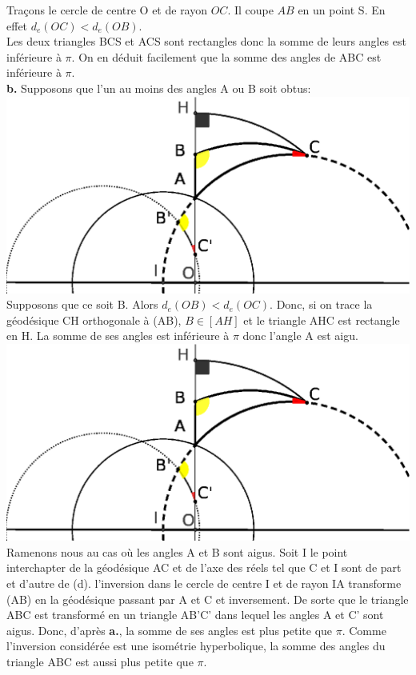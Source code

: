 \documentclass[a4paper, 12pt, twoside]{book}
\begin{document}
  Traçons le cercle de centre O et de rayon $OC$. Il coupe $AB$ en un point S. En effet  $d_{e}(OC)<d_{e}(OB)$. \\
  
  Les deux triangles BCS et ACS sont rectangles donc la somme de leurs angles est inférieure à $\pi$. On en déduit facilement que la somme des angles de ABC est inférieure à $\pi$.\\
  
  
  
  
  
   \textbf{b.} Supposons que l'un au moins des angles A ou B soit obtus:\\
   
   
  \includegraphics[scale=0.9]{figures/Hyper10.eps} \\  
  
  
  Supposons que ce soit B. Alors $d_{e}(OB)<d_{e}(OC)$. Donc, si on trace la géodésique CH orthogonale à (AB), $B\in [AH]$ et le triangle AHC 	est rectangle en H. La somme de ses angles est inférieure à $\pi$ donc l'angle A est aigu.\\
  
\includegraphics[scale=0.9]{figures/Hyper10.eps} \\ 

Ramenons nous au cas où les angles A et B sont aigus. Soit I le point interchapter de la géodésique AC et de l'axe des réels tel que C et I sont de	 part et d'autre de (d). l'inversion dans le cercle de centre I et de rayon IA transforme (AB) en la géodésique passant par A et C et inversement. De sorte que le triangle ABC est transformé en un triangle AB'C' dans lequel les angles A et C' sont aigus. Donc, d'après \textbf{a.}, la somme de ses angles est plus petite que $\pi$. Comme l'inversion considérée est une isométrie hyperbolique, la somme	 des angles du triangle ABC est aussi plus petite que $\pi$.\\
\end{document}
